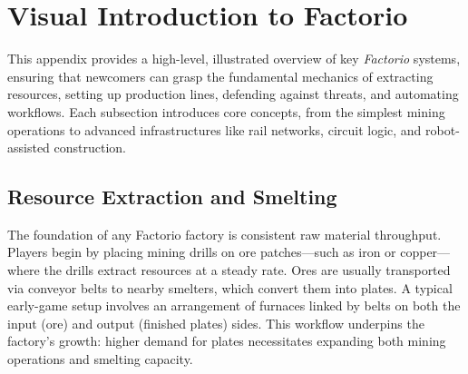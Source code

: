 

\newpage
\appendix
\section{Visual Introduction to Factorio}
\label{ref:sec_appendix}

This appendix provides a high-level, illustrated overview of key \textit{Factorio} systems, ensuring that newcomers can grasp the fundamental mechanics of extracting resources, setting up production lines, defending against threats, and automating workflows. Each subsection introduces core concepts, from the simplest mining operations to advanced infrastructures like rail networks, circuit logic, and robot-assisted construction.

\subsection{Resource Extraction and Smelting}
% 
The foundation of any Factorio factory is consistent raw material throughput. Players begin by placing mining drills on ore patches—such as iron or copper—where the drills extract resources at a steady rate. Ores are usually transported via conveyor belts to nearby smelters, which convert them into plates. A typical early-game setup involves an arrangement of furnaces linked by belts on both the input (ore) and output (finished plates) sides. This workflow underpins the factory’s growth: higher demand for plates necessitates expanding both mining operations and smelting capacity.

